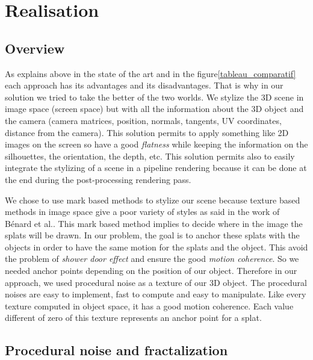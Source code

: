 \chapter{Realisation}


\section{Overview}

As explains above in the state of the art and in the figure\ref{tableau_comparatif} each approach has its advantages and its disadvantages. That is why in our solution we tried to take the better of the two worlds. We stylize the 3D scene in image space (screen space) but with all the information about the 3D object and the camera (camera matrices, position, normals, tangents, UV coordinates, distance from the camera). This solution permits to apply something like 2D images on the screen so have a good \textit{flatness} while keeping the information on the silhouettes, the orientation, the depth, etc. This solution permits also to easily integrate the stylizing of a scene in a pipeline rendering because it can be done at the end during the post-processing rendering pass. \newline

We chose to use mark based methods to stylize our scene because texture based methods in image space give a poor variety of styles as said in the work of Bénard et al.\cite{benard_dynamic_2009}. This mark based method implies to decide where in the image the splats will be drawn. In our problem, the goal is to anchor these splats with the objects in order to have the same motion for the splats and the object. This avoid the problem of \textit{shower door effect} and ensure the good \textit{motion coherence}. So we needed anchor points depending on the position of our object. Therefore in our approach, we used procedural noise\cite{perlin_improving_2002} as a texture of our 3D object. The procedural noises are easy to implement, fast to compute and easy to manipulate. Like every texture computed in object space, it has a good motion coherence. Each value different of zero of this texture represents an anchor point for a splat.


\section{Procedural noise and fractalization}

